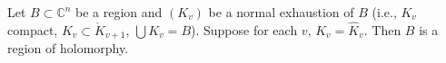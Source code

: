 Let $B \subset \mathbb{C}^n$ be a region and $(K_v)$ be a normal exhaustion of $B$ (i.e., $K_v$ compact, $K_v \subset \mathring{K}_{v+1}$, $\bigcup K_v = B$). Suppose for each $v$, $K_v = \hat{K}_v$. Then $B$ is a region of holomorphy.
